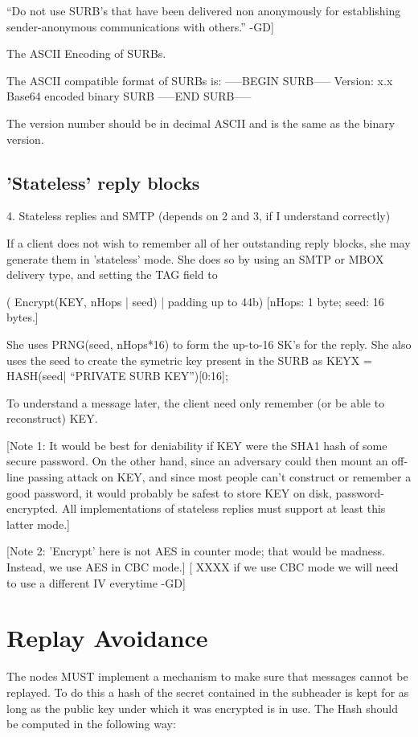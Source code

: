	``Do not use SURB's that have been delivered non anonymously
	for establishing sender-anonymous communications with others.''
								-GD]

The ASCII Encoding of SURBs.

The  ASCII compatible format of SURBs is:
-----BEGIN SURB-----
Version: x.x
Base64 encoded binary SURB 
-----END SURB-----

The version number should be in decimal ASCII and is the same as the
binary version.

\subsection{'Stateless' reply blocks}

4. Stateless replies and SMTP (depends on 2 and 3, if I understand correctly)

If a client does not wish to remember all of her outstanding
reply blocks, she may generate them in 'stateless' mode.  She  
does so by using an SMTP or MBOX delivery type, and setting
the TAG field to 

           ( Encrypt(KEY, nHops | seed) | padding up to 44b)
           [nHops: 1 byte; seed: 16 bytes.]

She uses PRNG(seed, nHops*16) to form the up-to-16 SK's for the reply.
She also uses the seed to create the symetric key present in the SURB
as KEYX = HASH(seed| ``PRIVATE SURB KEY'')[0:16];

To understand a message later, the client need only remember (or be
able to reconstruct) KEY.  

[Note 1: It would be best for deniability if KEY were the SHA1 hash of
some secure password.  On the other hand, since an adversary could
then mount an off-line passing attack on KEY, and since most people
can't construct or remember a good password, it would probably be
safest to store KEY on disk, password-encrypted.  All implementations
of stateless replies must support at least this latter mode.]

[Note 2: 'Encrypt' here is not AES in counter mode; that would be
madness.  Instead, we use AES in CBC mode.]
[ XXXX if we use CBC mode we will need to use a different IV everytime -GD]

\section{Replay Avoidance}

The nodes MUST implement a mechanism to make sure that messages cannot
be replayed. To do this a hash of the secret contained in the
subheader is kept for as long as the public key under which it was
encrypted is in use. The Hash should be computed in the following way:

